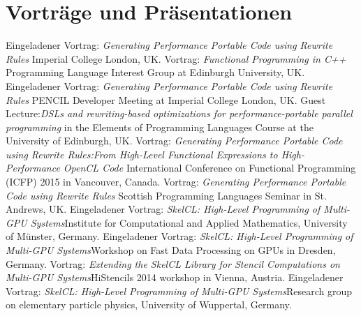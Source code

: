 \documentclass[11pt,a4paper]{moderncv}
\begin{document}
\section{Vorträge und Präsentationen}
         {Eingeladener Vortrag: \emph{Generating Performance Portable Code using Rewrite Rules}\newline
         \small Imperial College London, UK.}
         {Vortrag: \emph{Functional Programming in C++}\newline
         \small Programming Language Interest Group at Edinburgh University, UK.}
         {Eingeladener Vortrag: \emph{Generating Performance Portable Code using Rewrite Rules}\newline
         \small PENCIL Developer Meeting at Imperial College London, UK.}
         {Guest Lecture:\newline \emph{DSLs and rewriting-based optimizations for performance-portable parallel programming}\newline
         \small in the Elements of Programming Languages Course at the University of Edinburgh, UK.}
         {Vortrag: \emph{Generating Performance Portable Code using Rewrite Rules:\newline From High-Level Functional Expressions to High-Performance OpenCL Code}\newline
         \small International Conference on Functional Programming (ICFP) 2015 in Vancouver, Canada.}
         {Vortrag: \emph{Generating Performance Portable Code using Rewrite Rules}\newline
         \small Scottish Programming Languages Seminar in St. Andrews, UK.}
         {Eingeladener Vortrag: \emph{SkelCL: High-Level Programming of Multi-GPU
          Systems}\newline \small Institute for Computational and Applied
          Mathematics, University of Münster, Germany.}
         {Eingeladener Vortrag: \emph{SkelCL: High-Level Programming of Multi-GPU
          Systems}\newline \small Workshop on Fast Data Processing on GPUs in
          Dresden, Germany.}
         {Vortrag: \emph{Extending the SkelCL Library for Stencil
          Computations on Multi-GPU Systems}\newline \small HiStencils 2014
          workshop in Vienna, Austria.}
         {Eingeladener Vortrag: \emph{SkelCL: High-Level Programming of Multi-GPU
          Systems}\newline \small Research group on elementary particle physics,
          University of Wuppertal, Germany.}
\end{document}
